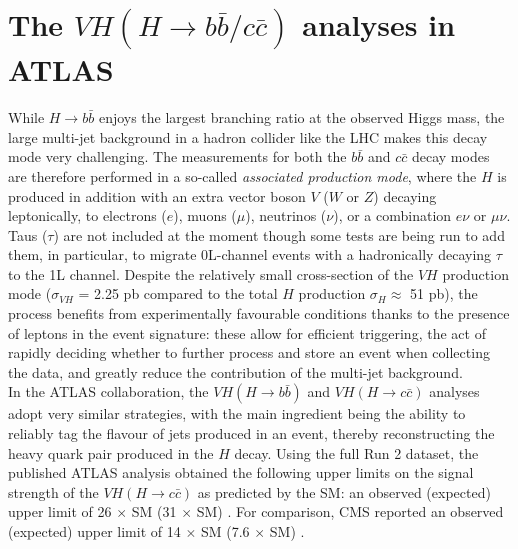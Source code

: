 \section{The $VH (H \rightarrow b\bar{b}/c\bar{c})$ analyses in ATLAS}
While $H \rightarrow b\bar{b}$ enjoys the largest branching ratio at the observed Higgs mass, the large multi-jet background in a hadron collider like the LHC makes this decay mode very challenging. The measurements for both the $b\bar{b}$ and $c\bar{c}$ decay modes are therefore performed in a so-called \textit{associated production mode}, where the $H$ is produced in addition with an extra vector boson $V$ ($W$ or $Z$) decaying leptonically, to electrons ($e$), muons ($\mu$), neutrinos ($\nu$), or a combination $e\nu$ or $\mu\nu$. Taus ($\tau$) are not included at the moment though some tests are being run to add them, in particular, to migrate 0L-channel events with a hadronically decaying $\tau$ to the 1L channel. Despite the relatively small cross-section of the $VH$ production mode ($\sigma_{VH}$ = 2.25 pb compared to the total $H$ production $\sigma_H \approx$ 51 pb), the process benefits from experimentally favourable conditions thanks to the presence of leptons in the event signature: these allow for efficient triggering, the act of rapidly deciding whether to further process and store an event when collecting the data, and greatly reduce the contribution of the multi-jet background. \\

In the ATLAS collaboration, the $VH (H\rightarrow b\bar{b})$ and $VH (H\rightarrow c\bar{c})$ analyses adopt very similar strategies, with the main ingredient being the ability to reliably tag the flavour of jets produced in an event, thereby reconstructing the heavy quark pair produced in the $H$ decay. Using the full Run 2 dataset, the published ATLAS analysis obtained the following upper limits on the signal strength of the $VH (H\rightarrow c\bar{c})$ as predicted by the SM: an observed (expected) upper limit of 26 $\times$ SM (31 $\times$ SM) \cite{Collaboration:2721696}. For comparison, CMS reported an observed (expected) upper limit of 14 $\times$ SM (7.6 $\times$ SM) \cite{arXiv:2205.05550}. \\ 

